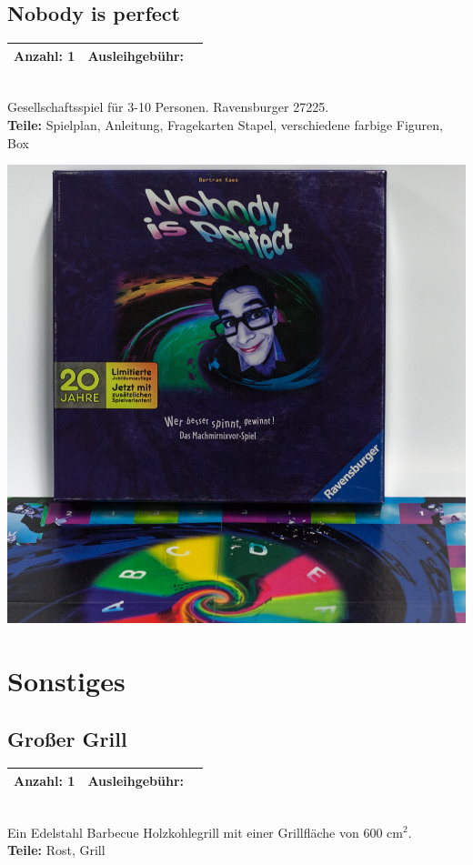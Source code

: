\documentclass[a4paper]{article}
\newcommand{\infobox}[3] %
        {\par
                \begin{tabular}{| c | c | c| }
                \hline
                Anzahl: #1 & Ausleihgebühr: \EUR{#2}   \\
                \hline
                \end{tabular} \\
        }
\begin{document}
\subsection{Nobody is perfect}
\infobox{1}{0}{Neu}
Gesellschaftsspiel für 3-10 Personen. Ravensburger 27225. \\
\textbf{Teile:} Spielplan, Anleitung, Fragekarten Stapel, verschiedene farbige Figuren, Box

\includegraphics[width=.3\textwidth]{Nobody is perfect.jpg}


\section{Sonstiges}

\subsection{Großer Grill}
\infobox{1}{10}{Neu}
Ein Edelstahl Barbecue Holzkohlegrill mit einer Grillfläche von 600 cm$^2$. \\
\textbf{Teile:} Rost, Grill

\end{document}

